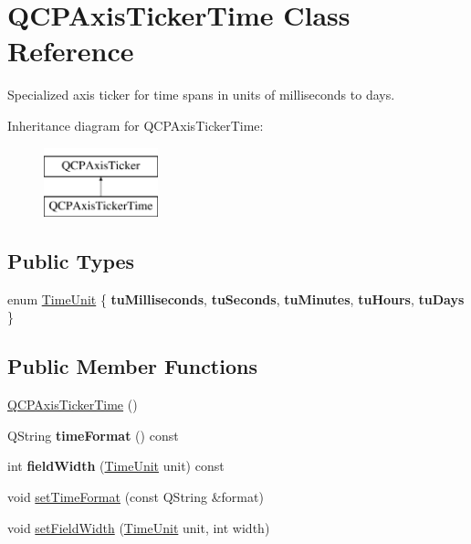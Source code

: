 \hypertarget{class_q_c_p_axis_ticker_time}{}\section{Q\+C\+P\+Axis\+Ticker\+Time Class Reference}
\label{class_q_c_p_axis_ticker_time}


Specialized axis ticker for time spans in units of milliseconds to days.  


Inheritance diagram for Q\+C\+P\+Axis\+Ticker\+Time\+:\begin{figure}[H]
\begin{center}
\leavevmode
\includegraphics[height=2.000000cm]{class_q_c_p_axis_ticker_time}
\end{center}
\end{figure}
\subsection*{Public Types}
\begin{DoxyCompactItemize}
\item 
enum \hyperlink{class_q_c_p_axis_ticker_time_a5c48ded8c6d3a1aca9b68219469fea3e}{Time\+Unit} \{ \newline
{\bfseries tu\+Milliseconds}, 
{\bfseries tu\+Seconds}, 
{\bfseries tu\+Minutes}, 
{\bfseries tu\+Hours}, 
\newline
{\bfseries tu\+Days}
 \}
\end{DoxyCompactItemize}
\subsection*{Public Member Functions}
\begin{DoxyCompactItemize}
\item 
\hyperlink{class_q_c_p_axis_ticker_time_a5145aac1d2117fdac411d9e8552cc41b}{Q\+C\+P\+Axis\+Ticker\+Time} ()
\item 
\mbox{\label{class_q_c_p_axis_ticker_time_a99ad61dc7434a7fed1850e96bf748834}} 
Q\+String {\bfseries time\+Format} () const
\item 
\mbox{\label{class_q_c_p_axis_ticker_time_a6b58a98e4d64c6764aa61a707e4a344d}} 
int {\bfseries field\+Width} (\hyperlink{class_q_c_p_axis_ticker_time_a5c48ded8c6d3a1aca9b68219469fea3e}{Time\+Unit} unit) const
\item 
void \hyperlink{class_q_c_p_axis_ticker_time_a2f30b6e5125bce4256be9ce3177088ea}{set\+Time\+Format} (const Q\+String \&format)
\item 
void \hyperlink{class_q_c_p_axis_ticker_time_adc13e54fc969be98a5c0e3fa0dbaa293}{set\+Field\+Width} (\hyperlink{class_q_c_p_axis_ticker_time_a5c48ded8c6d3a1aca9b68219469fea3e}{Time\+Unit} unit, int width)
\end{DoxyCompactItemize}

